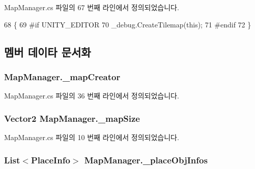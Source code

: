 Map\+Manager.\+cs 파일의 67 번째 라인에서 정의되었습니다.


\begin{DoxyCode}
68     \{
69 \textcolor{preprocessor}{#if UNITY\_EDITOR}
70         \_debug.CreateTilemap(\textcolor{keyword}{this});
71 \textcolor{preprocessor}{#endif}
72     \}
\end{DoxyCode}


\subsection{멤버 데이타 문서화}
\subsubsection[{\texorpdfstring{\+\_\+map\+Creator}{_mapCreator}}]{ Map\+Manager.\+\_\+map\+Creator\hspace{0.3cm}{\ttfamily [private]}}\hypertarget{class_map_manager_aa837a852f355a33b263c1bb07c6c4ece}{}\label{class_map_manager_aa837a852f355a33b263c1bb07c6c4ece}


Map\+Manager.\+cs 파일의 36 번째 라인에서 정의되었습니다.

\subsubsection[{\texorpdfstring{\+\_\+map\+Size}{_mapSize}}]{\setlength{\rightskip}{0pt plus 5cm}Vector2 Map\+Manager.\+\_\+map\+Size\hspace{0.3cm}{\ttfamily [private]}}\hypertarget{class_map_manager_a960f398cc92f569f620ddc8c0140a5c7}{}\label{class_map_manager_a960f398cc92f569f620ddc8c0140a5c7}


Map\+Manager.\+cs 파일의 10 번째 라인에서 정의되었습니다.

\subsubsection[{\texorpdfstring{\+\_\+place\+Obj\+Infos}{_placeObjInfos}}]{\setlength{\rightskip}{0pt plus 5cm}List$<${\bf Place\+Info}$>$ Map\+Manager.\+\_\+place\+Obj\+Infos\hspace{0.3cm}{\ttfamily [private]}}\hypertarget{class_map_manager_ab581d2c754246f74999a0b744ba2b14f}{}\label{class_map_manager_ab581d2c754246f74999a0b744ba2b14f}


